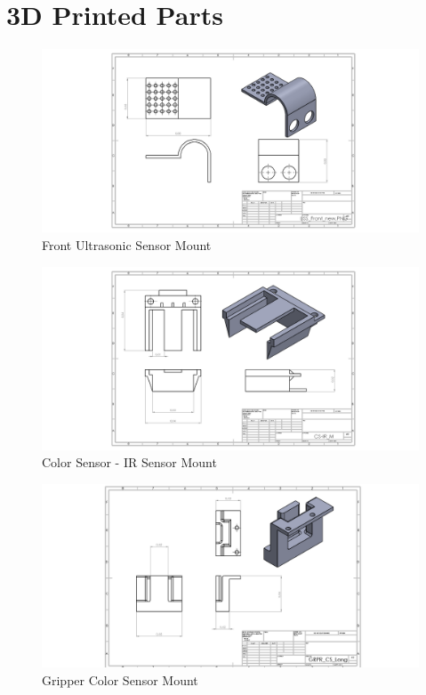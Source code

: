 \documentclass[12pt]{report}
\begin{document}
\section{3D Printed Parts}
\begin{figure}[H]
    \centering
    \includegraphics[width=1\textwidth]{Images/3D prints/USS_Front_new.PNG}
    \caption{Front Ultrasonic Sensor Mount}
    \label{fig:USS_front}
\end{figure}
\begin{figure}[H]
    \centering
    \includegraphics[width=1\textwidth]{Images/3D prints/CS-IR_M_new.PNG}
    \caption{Color Sensor - IR Sensor Mount}
    \label{fig:CS-IR mount}
\end{figure}


\begin{figure}[H]
    \centering
    \includegraphics[width=1\textwidth]{Images/3D prints/GRPR_CS_Long_new.PNG}
    \caption{Gripper Color Sensor Mount}
    \label{fig:GRPR_CS}
\end{figure}
\end{document}
